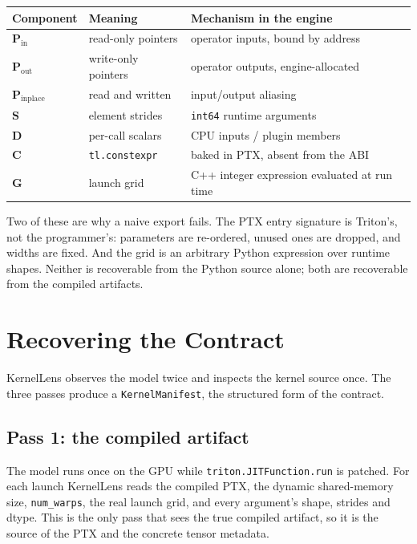 \documentclass[10pt]{article}
\begin{document}
\begin{center}
\small
\begin{tabularx}{\textwidth}{l l X}
\toprule
\textbf{Component} & \textbf{Meaning} & \textbf{Mechanism in the engine} \\ \midrule
$\mathbf{P}_{\text{in}}$ & read-only pointers & operator inputs, bound by address \\
$\mathbf{P}_{\text{out}}$ & write-only pointers & operator outputs, engine-allocated \\
$\mathbf{P}_{\text{inplace}}$ & read and written & input/output aliasing \\
$\mathbf{S}$ & element strides & \texttt{int64} runtime arguments \\
$\mathbf{D}$ & per-call scalars & CPU inputs / plugin members \\
$\mathbf{C}$ & \texttt{tl.constexpr} & baked in PTX, absent from the ABI \\
$\mathbf{G}$ & launch grid & C++ integer expression evaluated at run time \\
\bottomrule
\end{tabularx}
\label{tab:contract}
\end{center}

Two of these are why a naive export fails. The PTX entry signature is Triton's,
not the programmer's: parameters are re-ordered, unused ones are dropped, and
widths are fixed. And the grid is an arbitrary Python expression over runtime
shapes. Neither is recoverable from the Python source alone; both are recoverable
from the compiled artifacts.

\section{Recovering the Contract}
\label{sec:recover}

KernelLens observes the model twice and inspects the kernel source once. The
three passes produce a \texttt{KernelManifest}, the structured form of the
contract.

\subsection{Pass 1: the compiled artifact}

The model runs once on the GPU while \texttt{triton.JITFunction.run} is patched.
For each launch KernelLens reads the compiled PTX, the dynamic shared-memory
size, \texttt{num\_warps}, the real launch grid, and every argument's shape,
strides and dtype. This is the only pass that sees the true compiled artifact, so
it is the source of the PTX and the concrete tensor metadata.
\end{document}
